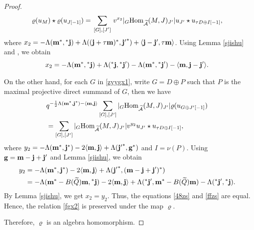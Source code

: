 \documentclass[reqno,12pt]{amsart}
\numberwithin{equation}{section}
\def\lr#1{\langle #1\rangle} \def\fin{\hfill$\square$}  \def\lra{\longrightarrow} \def\mod{\mbox{\rm \textbf{mod}}\,}\def\Mod{\mbox{\rm mod}\,}\def\top{\mbox{\rm top}\,}\def\soc{\mbox{\rm soc}\,}
\theoremstyle{plain} %
\theoremstyle{definition} %
\begin{document}
\begin{proof}
\begin{equation}
\varrho(u_M)\star\varrho(u_{J[-1]})=\sum\limits_{\begin{smallmatrix}[G],[J']\end{smallmatrix}}v^{x_2}|_{G}\mbox{\rm Hom}_{\widetilde{\mathcal{A}}}(M,J)_{J'}|u_{J'}\star u_{\tau D\oplus I[-1]},
\end{equation}
where $x_2=-\Lambda({\bf m}^\ast,{^*{\bf j}})+\Lambda(({\bf j}+{\tau{\bf m}})^*,{{\bf j}'}^*)+\lr{{\bf j}-{\bf j}',\tau{\bf m}}$.
Using Lemma \ref{sjishu} and \cite[Lemma 6.4]{CDZ}, we obtain
\begin{equation*}
x_2=-\Lambda({\bf m}^\ast,{^*{\bf j}})+\Lambda({^*{\bf j}},{^*{\bf j}'})-\Lambda({\bf m}^\ast,{^*{\bf j}'})-\lr{{\bf m},{\bf j}-{{\bf j}'}}.
\end{equation*}

On the other hand, for each $G$ in \eqref{zyygx1}, write $G=D\oplus P$ such that $P$ is the maximal projective direct summand of $G$, then we have
\begin{equation}\label{ffzs}
\begin{split}&q^{-\frac{1}{2}\Lambda({\bf m}^\ast,{\bf j}^\ast)-\lr{{\bf m},{\bf j}}}
\sum\limits_{[G],[J']}|{}_{G}\Hom_{\widetilde{\A}}(M,J)_{J'}|\varrho(u_{G\oplus J'[-1]})\\
&=\sum\limits_{[G],[J']}|{}_{G}\Hom_{\widetilde{\A}}(M,J)_{J'}|v^{y_2}u_{J'}\star u_{\tau D\oplus I[-1]},
\end{split}\end{equation}
where $y_2=-\Lambda({\bf m}^\ast,{\bf j}^\ast)-2\lr{{\bf m},{\bf j}}+\Lambda({{\bf j}'}^\ast,{\bf g}^\ast)$ and $I=\nu(P)$.
Using ${\bf g}={\bf m}-{\bf j}+{\bf j}'$ and Lemma \ref{sjishu}, we obtain
\begin{equation*}
\begin{split}
y_2&=-\Lambda({\bf m}^\ast,{\bf j}^\ast)-2\lr{{\bf m},{\bf j}}+\Lambda({{\bf j}'}^\ast,({\bf m}-{\bf j}+{\bf j}')^\ast)\\
&=-\Lambda({\bf m}^\ast-B(\widetilde{Q}){\bf m},{^*{\bf j}})-2\lr{{\bf m},{\bf j}}+\Lambda({^*{\bf j}'},{\bf m}^\ast-B(\widetilde{Q}){\bf m})-\Lambda({^*{\bf j}'},{^*{\bf j}}).
\end{split}\end{equation*}
By Lemma \ref{sjishu}, we get $x_2=y_2$. Thus, the equations \eqref{48zs} and \eqref{ffzs} are equal. Hence, the relation \eqref{fgx2} is preserved under the map $\varrho$.

Therefore, $\varrho$ is an algebra homomorphism.
\end{proof}
\end{document}
